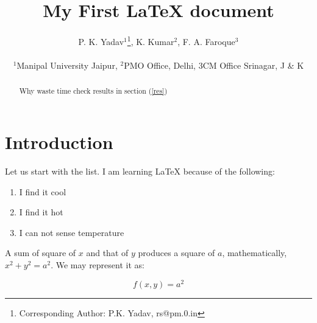 \documentclass[11pt, a4paper]{article}
\begin{document}
\title{My First \LaTeX{} document}
\author{P. K. Yadav$^1$\thanks{Corresponding Author: P.K. Yadav, \newline rs@pm.0.in},  K. Kumar$^2$, F. A. Faroque$^3$ \\\\ $^1$Manipal University Jaipur, $^2$PMO Office, Delhi, $3$CM Office Srinagar, J \& K}


\maketitle

\begin{abstract}\label{abs}
Why waste time check results in section (\ref{res})
\end{abstract}


\section{Introduction}\label{Intro}

Let us start with the list. I am learning \LaTeX{} because of the following:
\begin{enumerate}
\item I find it cool
\item I find it hot
\item I can not sense temperature
\end{enumerate}

A sum of square of $x$ and that of $y$ produces a square of $a$, mathematically, $x^2+y^2 = a^2$. We may represent it as:

\begin{equation}
f(x,y) = a^2
\end{equation}
\end{document}
